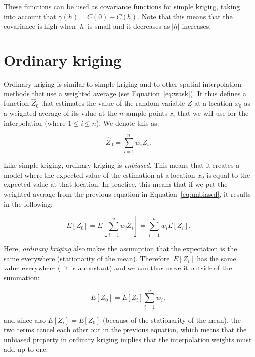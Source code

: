 These functions can be used as covariance functions for simple kriging, taking into account that \(\gamma(h) = C(0) - C(h)\).
Note that this means that the covariance is high when \(|h|\) is small and it decreases as \(|h|\) increases.

\section{Ordinary kriging}

Ordinary kriging is similar to simple kriging and to other spatial interpolation methods that use a weighted average (see Equation~\ref{eq:wask}).
It thus defines a function \(\hat{Z}_0\) that estimates the value of the random variable \(Z\) at a location \(x_0\) as a weighted average of its value at the \(n\) sample points \(x_i\) that we will use for the interpolation (where \(1 \leq i \leq n\)).
We denote this as:

\begin{equation}
\label{eq:waok}
\hat{Z}_0 = \sum_{i=1}^n w_i Z_i.
\end{equation}

Like simple kriging, ordinary kriging is \emph{unbiased}.
This means that it creates a model where the expected value of the estimation at a location \(x_0\) is equal to the expected value at that location.
In practice, this means that if we put the weighted average from the previous equation in Equation~\ref{eq:unbiased}, it results in the following:

\begin{equation}
E\left[ Z_0 \right] = E\left[ \sum_{i=1}^n w_i Z_i\right] = \sum_{i=1}^n w_i E\left[Z_i\right].
\end{equation}

Here, \emph{ordinary kriging} also makes the assumption that the expectation is the same everywhere (stationarity of the mean).
Therefore, \(E\left[Z_i\right]\) has the same value everywhere (\ie\ it is a constant) and we can thus move it outside of the summation:

\begin{equation}
E\left[ Z_0 \right] = E\left[Z_i\right] \sum_{i=1}^n w_i,
\end{equation}

and since also \(E\left[Z_i\right] = E\left[ Z_0 \right] \) (because of the stationarity of the mean), the two terms cancel each other out in the previous equation, which means that the unbiased property in ordinary kriging implies that the interpolation weights must add up to one:

